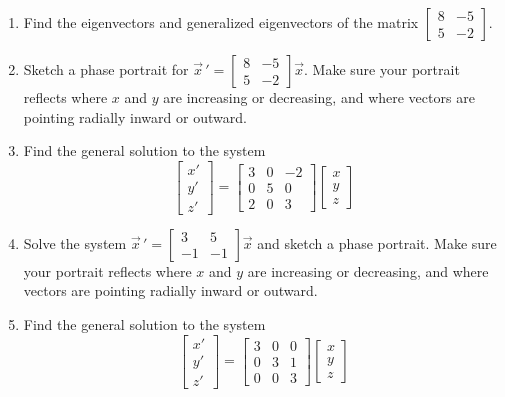 \documentclass[12pt]{article}
\newcommand{\vvv}[3]{\begin{bmatrix} #1 \\ #2 \\ #3\end{bmatrix}}
\begin{document}
\begin{enumerate}
  
  \item Find the eigenvectors and generalized eigenvectors of the matrix $\begin{bmatrix} 8 & -5 \\ 5 & -2\end{bmatrix}$.
 
 \item Sketch a phase portrait for $\vec x\,'=\begin{bmatrix} 8 & -5 \\ 5 & -2\end{bmatrix}\vec x$. Make sure your portrait reflects where $x$ and $y$ are increasing or decreasing, and where vectors are pointing radially inward or outward.
 
 \item Find the general solution to the system
 $$\vvv{x'}{y'}{z'} = \begin{bmatrix} 3&0&-2\\0&5&0\\2&0&3 \end{bmatrix}\vvv xyz$$
 
 \item Solve the system $\vec x\,'=\begin{bmatrix} 3 & 5\\ -1& -1 \end{bmatrix}\vec x$ and sketch a phase portrait. Make sure your portrait reflects where $x$ and $y$ are increasing or decreasing, and where vectors are pointing radially inward or outward.
 
 \item Find the general solution to the system
  $$\vvv{x'}{y'}{z'} = \begin{bmatrix} 3 & 0 & 0 \\ 0 & 3 & 1 \\ 0 & 0 & 3 \end{bmatrix}\vvv xyz$$
  

\end{enumerate}
\end{document}
